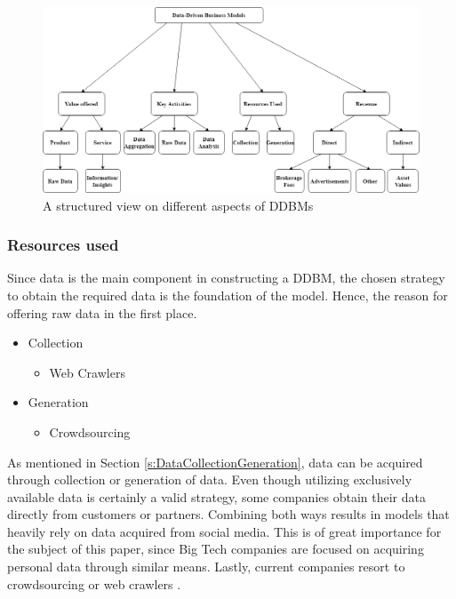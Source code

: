 \begin{figure}[t]
\centering
    \includegraphics[width=\textwidth]{figures/ddbm.png}
\caption{A structured view on different aspects of \gls{DDBM}s \cite{Hartmann2016}}
\label{fig:DDBM overview}
\end{figure}

\subsubsection{Resources used}

Since data is the main component in constructing a \gls{DDBM}, the chosen strategy to obtain the required data is the foundation of the model.
Hence, the reason for offering raw data in the first place.

\begin{itemize}
    \item Collection
    \begin{itemize}
        \item Web Crawlers \cite{web_crawler}
    \end{itemize}
    \item Generation
    \begin{itemize}
        \item Crowdsourcing \cite{Brabham2008}
    \end{itemize}
    
\end{itemize}

As mentioned in Section \ref{s:DataCollectionGeneration}, data can be acquired through collection or generation of data. 
Even though utilizing exclusively available data is certainly a valid strategy, some companies obtain their data directly from customers or partners. 
Combining both ways results in models that heavily rely on data acquired from social media.
This is of great importance for the subject of this paper, since Big Tech companies are focused on acquiring personal data through similar means.
Lastly, current companies resort to crowdsourcing or web crawlers \cite{Hartmann2016, web_crawler, Brabham2008}.


